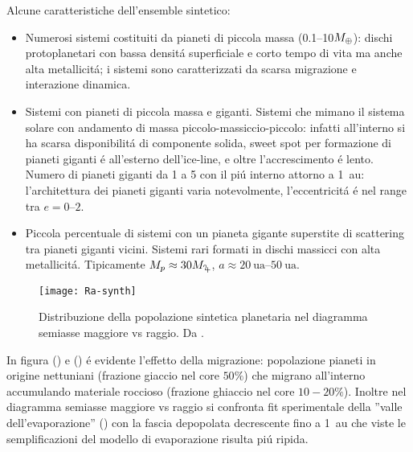 Alcune caratteristiche dell'ensemble sintetico: %
\begin{itemize}
\item Numerosi sistemi costituiti da pianeti di piccola massa (\numrange{0.1}{10}$M_{\oplus}{}$): dischi protoplanetari con bassa densit\'a superficiale e corto tempo di vita ma anche alta metallicit\'a; i sistemi sono caratterizzati da scarsa migrazione e interazione dinamica.
\item Sistemi con pianeti di piccola massa e giganti. Sistemi che mimano il sistema solare con andamento di massa piccolo-massiccio-piccolo: infatti all'interno si ha scarsa disponibilit\'a di componente solida, sweet spot per formazione di pianeti giganti \'e all'esterno dell'ice-line, e oltre l'accrescimento \'e lento. Numero di pianeti giganti da 1 a 5 con il pi\'u interno attorno a \SI{1}{\astronomicalunit}: l'architettura dei pianeti giganti varia notevolmente, l'eccentricit\'a \'e nel range tra $e=\numrange{0}{2}$.
\item Piccola percentuale di sistemi con un pianeta gigante superstite di scattering tra pianeti giganti vicini. Sistemi rari formati in dischi massicci con alta metallicit\'a. Tipicamente $M_p\approx30\mjupiter{}$, $a\approx\SIrange{20}{50}{\astronomicalunit}$.
\end{itemize}

\begin{figure}[!ht]
	\texttt{[image: Ra-synth]}
	\caption{Distribuzione della popolazione sintetica planetaria nel diagramma semiasse maggiore vs raggio. Da \cite{mordasini2018planetary}.}\label{fig:Ra-synth}
\end{figure}

In figura () e (\cite{fig:Ra-synth}) \'e evidente l'effetto della migrazione: popolazione pianeti in origine nettuniani (frazione giaccio nel core $50\%$) che migrano all'interno accumulando materiale roccioso (frazione ghiaccio nel core $10-20\%$). Inoltre nel diagramma semiasse maggiore vs raggio si confronta fit sperimentale della ''valle dell'evaporazione'' (\cite{van2018asteroseismic}) con la fascia depopolata decrescente fino a \SI{1}{\astronomicalunit} che viste le semplificazioni del modello di evaporazione risulta pi\'u ripida.

